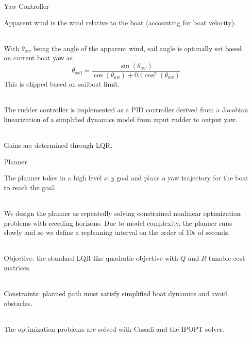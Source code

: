\documentclass[10pt,xcolor={table,dvipsnames},t]{beamer}
\begin{document}
\begin{frame}{Yaw Controller}

    Apparent wind is the wind relative to the boat (accounting for boat velocity).
    
    \hfill\\
    With \(\theta_{aw}\) being the angle of the apparent wind, sail angle is optimally set based on current boat yaw as 
    \begin{equation}
        \theta_{\text{sail}} = \frac{\sin(\theta_{aw})}{\cos(\theta_{aw}) + 0.4\cos^2(\theta_{aw})}
    \end{equation}
    This is clipped based on sailboat limit.

    \hfill\\
    The rudder controller is implemented as a PID controller derived from a Jacobian linearization of a simplified dynamics model from input rudder to output yaw.
    
    \hfill\\
    Gains are determined through LQR.
    
\end{frame}

\begin{frame}{Planner}
    
    The planner takes in a high level \(x, y\) goal and plans a yaw trajectory for the boat 
    to reach the goal.
    
    \hfill\\
    We design the planner as repeatedly solving constrained nonlinear optimization problems with receding horizons. Due to model complexity, the planner runs slowly and so we define a 
    replanning interval on the order of 10s of seconds.
    
    \hfill\\
    Objective: the standard LQR-like quadratic objective with \(Q\) and \(R\) tunable cost matrices.
    
    \hfill\\
    Constraints: planned path must satisfy simplified boat dynamics and avoid obstacles.
    
    \hfill\\
    The optimization problems are solved with Casadi and the IPOPT solver.
    
\end{frame}
\end{document}
